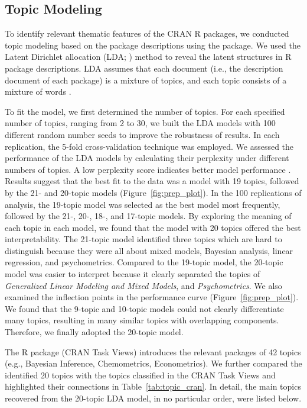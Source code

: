 \subsection{Topic Modeling}



To identify relevant thematic features of the CRAN R packages, we conducted topic modeling based on the package descriptions using the  \citep{topicmodels} package. We used the Latent Dirichlet allocation (LDA; \citealp{blei2003latent}) method to reveal the latent structures in R package descriptions. LDA assumes that each document (i.e., the description document of each package) is a mixture of topics, and each topic consists of a mixture of words \citep{silge2017text}.

To fit the model, we first determined the number of topics. For each specified number of topics, ranging from 2 to 30, we built the LDA models with 100 different random number seeds to improve the robustness of results. In each replication, the 5-fold cross-validation technique was employed. We assessed the performance of the LDA models by calculating their perplexity under different numbers of topics. A low perplexity score indicates better model performance \citep{bao2014simultaneously}.  Results suggest that the best fit to the data was a model with 19 topics, followed by the 21- and 20-topic models (Figure~\ref{fig:prep_plot}). In the 100 replications of analysis, the 19-topic model was selected as the best model most frequently, followed by the 21-, 20-, 18-, and 17-topic models. By exploring the meaning of each topic in each model, we found that the model with 20 topics offered the best interpretability. The 21-topic model identified three topics which are hard to distinguish because they were all about mixed models, Bayesian analysis, linear regression, and psychometrics.  Compared to the 19-topic model, the 20-topic model was easier to interpret because it clearly separated the topics of {\it Generalized Linear Modeling and Mixed Models}, and {\it Psychometrics}. We also examined the inflection points in the performance curve (Figure~\ref{fig:prep_plot}). We found that the 9-topic and 10-topic models could not clearly differentiate many topics, resulting in many similar topics with overlapping components. Therefore, we finally adopted the 20-topic model. 


The R package  (CRAN Task Views) introduces the relevant packages of 42 topics (e.g., Bayesian Inference, Chemometrics, Econometrics). We further compared the identified 20 topics with the topics classified in the CRAN Task Views and highlighted their connections in Table~\ref{tab:topic_cran}. In detail, the main topics recovered from the 20-topic LDA model, in no particular order, were listed below.


